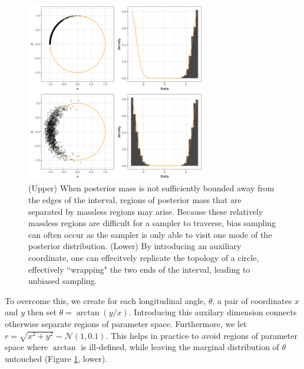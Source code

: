 \documentclass[ba]{imsart}
\numberwithin{equation}{section}
\theoremstyle{plain}
\begin{document}
\begin{figure}[h]
\centering
\vspace{.1in}
\includegraphics[width=0.7\textwidth]{figures/donut.png}
\vspace{.05in}
\caption{(Upper) When posterior mass is not sufficiently bounded away from the edges of the interval, regions of posterior mass that are separated by massless regions may arise. Because these relatively massless regions are difficult for a sampler to traverse, bias sampling can often occur as the sampler is only able to visit one mode of the posterior distribution. (Lower) By introducing an auxiliary coordinate, one can effecitvely replicate the topology of a circle, effectively ``wrapping" the two ends of the interval, leading to unbiased sampling.}
\label{fig:donut}
\end{figure}

\noindent To overcome this, we create for each longitudinal angle, $\theta$, a pair of coordinates $x$ and $y$ then set $\theta = \arctan(y/x)$. Introducing this auxilary dimension connects otherwise separate regions of parameter space. Furthermore, we let $r = \sqrt{x^2 + y^2} \sim \mathcal{N}(1, 0.1)$. This helps in practice to avoid regions of parameter space where $\arctan$ is ill-defined, while leaving the marginal distribution of $\theta$ untouched (Figure \ref{fig:donut}, lower).

\end{document}
